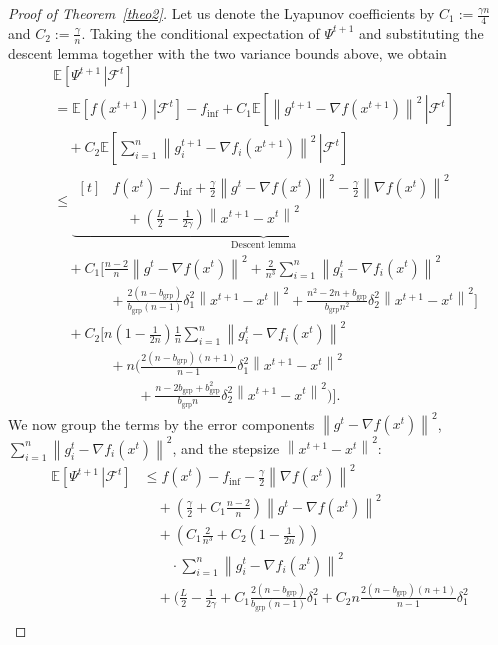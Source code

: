 \documentclass{article}
\newcommand{\sqn}[1]{\left\| #1 \right\|^2}
\newcommand{\finf}{f_\mathrm{inf}}
\newcommand{\eqdef}{:=}
\newcommand{\Expb}[2]{\mathbb{E}\!\left[\left. #1\,\right|#2 \right]}
\newcommand{\Expc}[1]{\Expb{#1}{\mathcal{F}^t}}
\theoremstyle{plain}
\begin{document}
\begin{proof}[Proof of Theorem~\ref{theo2}]
Let us denote the Lyapunov coefficients by $C_1 \eqdef \frac{\gamma n}{4}$ and $C_2\eqdef \frac{\gamma}{n}$.
Taking the conditional expectation of $\Psi^{t+1}$ and substituting the descent lemma together with the two variance bounds above, we obtain
\begin{align*}
&\Expc{\Psi^{t+1}} \\
&=\Expc{f(x^{t+1})}-\finf
+C_1\Expc{\sqn{g^{t+1}-\nabla f(x^{t+1})}}\\
&\quad+C_2\Expc{\sum_{i=1}^n\sqn{g_i^{t+1}-\nabla f_i(x^{t+1})}}\\
&\leq
\underbrace{\begin{aligned}[t]
&f(x^t)-\finf
+\frac{\gamma}{2}\sqn{g^{t}-\nabla f(x^t)}
-\frac{\gamma}{2}\sqn{\nabla f(x^t)}\\
&\quad+\left(\frac{L}{2}-\frac{1}{2\gamma}\right)\sqn{x^{t+1}-x^t}
\end{aligned}}_{\text{Descent lemma}}\\
&\quad +C_1\Bigg[\frac{n-2}{n}\sqn{g^t-\nabla f(x^{t})}
+\frac{2}{n^3}\sum_{i=1}^n \sqn{g_i^t-\nabla f_i(x^{t})}\\
&\qquad\qquad
+\frac{2(n-b_{\mathrm{grp}})}{b_{\mathrm{grp}}(n-1)}\delta_1^2\sqn{x^{t+1}-x^t}
+\frac{n^2-2n+b_{\mathrm{grp}}}{b_{\mathrm{grp}}n^2}\delta_2^2\sqn{x^{t+1}-x^t}\Bigg]\\
&\quad +C_2\Bigg[n\left(1-\frac{1}{2n}\right)
\frac{1}{n}\sum_{i=1}^n \sqn{g_i^t-\nabla f_i(x^{t})}\\
&\qquad\qquad
+n\Bigg(\frac{2(n-b_{\mathrm{grp}})(n+1)}{n-1}\delta_1^2\sqn{x^{t+1}-x^t}\\
&\qquad\qquad\qquad
+\frac{n-2b_{\mathrm{grp}}+b_{\mathrm{grp}}^2}{b_{\mathrm{grp}}n}\delta_2^2\sqn{x^{t+1}-x^t}\Bigg)\Bigg].
\end{align*}
We now group the terms by the error components $\sqn{g^t-\nabla f(x^t)}$, $\sum_{i=1}^n\sqn{g_i^t-\nabla f_i(x^t)}$, and the stepsize $\sqn{x^{t+1}-x^t}$:
\begin{align*}
\Expc{\Psi^{t+1}}
&\leq f(x^t)-\finf-\frac{\gamma}{2}\sqn{\nabla f(x^t)}\\
&\quad+\left(\frac{\gamma}{2}+C_1\frac{n-2}{n}\right)\sqn{g^t-\nabla f(x^t)}\\
&\quad+\left(C_1\frac{2}{n^3}+C_2\left(1-\frac{1}{2n}\right)\right)\\
&\qquad\cdot\sum_{i=1}^n\sqn{g_i^t-\nabla f_i(x^t)}\\
&\quad+\Bigg(\frac{L}{2}-\frac{1}{2\gamma}
+C_1\frac{2(n-b_{\mathrm{grp}})}{b_{\mathrm{grp}}(n-1)}\delta_1^2
+C_2n\frac{2(n-b_{\mathrm{grp}})(n+1)}{n-1}\delta_1^2\\

\end{align*}
\end{proof}
\end{document}
